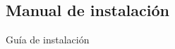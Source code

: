 \begin{appendices}
\chapter{Manual de instalación}\label{anexo:manual_de_instalacion}

Guía de instalación
\end{appendices}